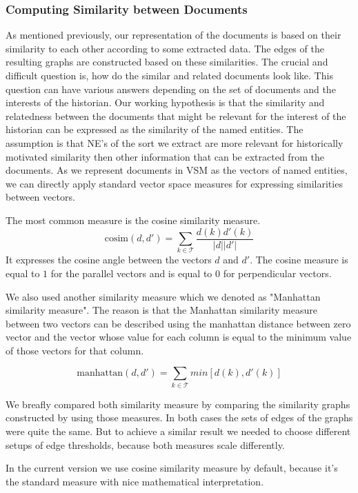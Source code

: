 \subsubsection{Computing Similarity between Documents}\label{sec:computing_similarity_between_documents}

As mentioned previously, our representation of the documents is based on their similarity to each other according to some extracted data. The edges of the resulting graphs are constructed based on these similarities. The crucial and difficult question is, how do the similar and related documents look like. This question can have various answers depending on the set of documents and the interests of the historian. Our working hypothesis is that the similarity and relatedness between the documents that might be relevant for the interest of the historian can be expressed as the similarity of the named entities. 
The assumption is that NE's of the sort we extract are more relevant for historically motivated similarity then other information that can be extracted from the documents. As we represent documents in VSM as the vectors of named entities, we can directly apply standard vector space measures for expressing similarities between vectors. 

The most common measure is the cosine similarity measure.
\[\text{cosim}(d,d') = \sum_{k \in \mathcal{T}}\frac{d(k)d'(k)}{|d||d'|}\]
It expresses the cosine angle between the vectors $d$ and $d'$. The cosine measure is equal to $1$ for the parallel vectors and is equal to $0$ for perpendicular vectors.

We also used another similarity measure which we denoted as "Manhattan similarity measure". The reason is that the Manhattan similarity measure between two vectors can be described using the manhattan distance between zero vector and the vector whose value for each column is equal to the minimum value of those vectors for that column.

\[\text{manhattan}(d,d') = \sum_{k \in \mathcal{T}}min[d(k), d'(k)]\]

We breafly compared both similarity measure by comparing the similarity graphs constructed by using those measures. In both cases the sets of edges of the graphs were quite the same. But to achieve a similar result we needed to choose different setups of edge thresholds, because both measures scale differently.

In the current version we use cosine similarity measure by default, because it's the standard measure with nice mathematical interpretation.

